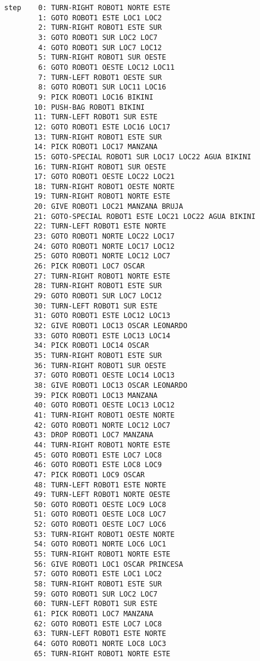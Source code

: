 \documentclass{article}
\begin{document}
\begin{lstlisting}
step    0: TURN-RIGHT ROBOT1 NORTE ESTE
        1: GOTO ROBOT1 ESTE LOC1 LOC2
        2: TURN-RIGHT ROBOT1 ESTE SUR
        3: GOTO ROBOT1 SUR LOC2 LOC7
        4: GOTO ROBOT1 SUR LOC7 LOC12
        5: TURN-RIGHT ROBOT1 SUR OESTE
        6: GOTO ROBOT1 OESTE LOC12 LOC11
        7: TURN-LEFT ROBOT1 OESTE SUR
        8: GOTO ROBOT1 SUR LOC11 LOC16
        9: PICK ROBOT1 LOC16 BIKINI
       10: PUSH-BAG ROBOT1 BIKINI
       11: TURN-LEFT ROBOT1 SUR ESTE
       12: GOTO ROBOT1 ESTE LOC16 LOC17
       13: TURN-RIGHT ROBOT1 ESTE SUR
       14: PICK ROBOT1 LOC17 MANZANA
       15: GOTO-SPECIAL ROBOT1 SUR LOC17 LOC22 AGUA BIKINI
       16: TURN-RIGHT ROBOT1 SUR OESTE
       17: GOTO ROBOT1 OESTE LOC22 LOC21
       18: TURN-RIGHT ROBOT1 OESTE NORTE
       19: TURN-RIGHT ROBOT1 NORTE ESTE
       20: GIVE ROBOT1 LOC21 MANZANA BRUJA
       21: GOTO-SPECIAL ROBOT1 ESTE LOC21 LOC22 AGUA BIKINI
       22: TURN-LEFT ROBOT1 ESTE NORTE
       23: GOTO ROBOT1 NORTE LOC22 LOC17
       24: GOTO ROBOT1 NORTE LOC17 LOC12
       25: GOTO ROBOT1 NORTE LOC12 LOC7
       26: PICK ROBOT1 LOC7 OSCAR
       27: TURN-RIGHT ROBOT1 NORTE ESTE
       28: TURN-RIGHT ROBOT1 ESTE SUR
       29: GOTO ROBOT1 SUR LOC7 LOC12
       30: TURN-LEFT ROBOT1 SUR ESTE
       31: GOTO ROBOT1 ESTE LOC12 LOC13
       32: GIVE ROBOT1 LOC13 OSCAR LEONARDO
       33: GOTO ROBOT1 ESTE LOC13 LOC14
       34: PICK ROBOT1 LOC14 OSCAR
       35: TURN-RIGHT ROBOT1 ESTE SUR
       36: TURN-RIGHT ROBOT1 SUR OESTE
       37: GOTO ROBOT1 OESTE LOC14 LOC13
       38: GIVE ROBOT1 LOC13 OSCAR LEONARDO
       39: PICK ROBOT1 LOC13 MANZANA
       40: GOTO ROBOT1 OESTE LOC13 LOC12
       41: TURN-RIGHT ROBOT1 OESTE NORTE
       42: GOTO ROBOT1 NORTE LOC12 LOC7
       43: DROP ROBOT1 LOC7 MANZANA
       44: TURN-RIGHT ROBOT1 NORTE ESTE
       45: GOTO ROBOT1 ESTE LOC7 LOC8
       46: GOTO ROBOT1 ESTE LOC8 LOC9
       47: PICK ROBOT1 LOC9 OSCAR
       48: TURN-LEFT ROBOT1 ESTE NORTE
       49: TURN-LEFT ROBOT1 NORTE OESTE
       50: GOTO ROBOT1 OESTE LOC9 LOC8
       51: GOTO ROBOT1 OESTE LOC8 LOC7
       52: GOTO ROBOT1 OESTE LOC7 LOC6
       53: TURN-RIGHT ROBOT1 OESTE NORTE
       54: GOTO ROBOT1 NORTE LOC6 LOC1
       55: TURN-RIGHT ROBOT1 NORTE ESTE
       56: GIVE ROBOT1 LOC1 OSCAR PRINCESA
       57: GOTO ROBOT1 ESTE LOC1 LOC2
       58: TURN-RIGHT ROBOT1 ESTE SUR
       59: GOTO ROBOT1 SUR LOC2 LOC7
       60: TURN-LEFT ROBOT1 SUR ESTE
       61: PICK ROBOT1 LOC7 MANZANA
       62: GOTO ROBOT1 ESTE LOC7 LOC8
       63: TURN-LEFT ROBOT1 ESTE NORTE
       64: GOTO ROBOT1 NORTE LOC8 LOC3
       65: TURN-RIGHT ROBOT1 NORTE ESTE

\end{lstlisting}
\end{document}
